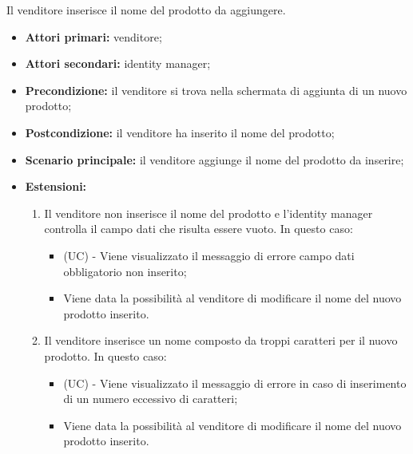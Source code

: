 \resetSubUC
{}
Il venditore inserisce il nome del prodotto da aggiungere.
\begin{itemize}
    \item \textbf{Attori primari:} venditore;
    \item \textbf{Attori secondari:} identity manager;
    \item \textbf{Precondizione:} il venditore si trova nella schermata di aggiunta di un nuovo prodotto;
    \item \textbf{Postcondizione:} il venditore ha inserito il nome del prodotto;
    \item \textbf{Scenario principale:} il venditore aggiunge il nome del prodotto da inserire;
    \item \textbf{Estensioni:} 
    \begin{enumerate}[label=\lett]
    	\item Il venditore non inserisce il nome del prodotto e l'identity manager controlla il campo dati che risulta essere vuoto. In questo caso:
	    \begin{itemize}
	        \item (UC) - Viene visualizzato il messaggio di errore campo dati obbligatorio non inserito;
	        \item Viene data la possibilità al venditore di modificare il nome del nuovo prodotto inserito.
	    \end{itemize}
    	\item Il venditore inserisce un nome composto da troppi caratteri per il nuovo prodotto. In questo caso:
    	\begin{itemize}
    		\item (UC) - Viene visualizzato il messaggio di errore in caso di inserimento di un numero eccessivo di caratteri;
    		\item Viene data la possibilità al venditore di modificare il nome del nuovo prodotto inserito.
    	\end{itemize}
	\end{enumerate}
\end{itemize}

